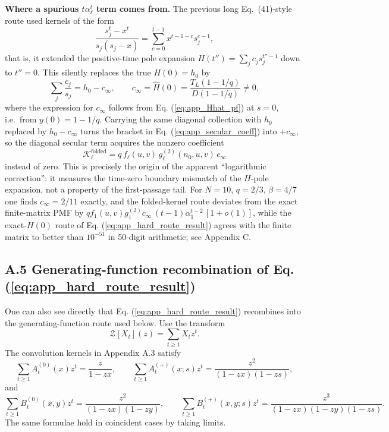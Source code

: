 \documentclass[superscriptaddress, amsmath, amssymb, aps, pre, floatfix]{revtex4-2}
\begin{document}
\medskip
\noindent\textbf{Where a spurious \(t\alpha_\ell^t\) term comes from.}
The previous long Eq.~(41)-style route used kernels of the form
\[
  \frac{s_j^{t}-x^{t}}{s_j(s_j-x)}=\sum_{c=0}^{t-1}x^{t-1-c}s_j^{c-1},
\]
that is, it extended the positive-time pole expansion \(H(t'')=\sum_j c_js_j^{t''-1}\) down to \(t''=0\).  This silently replaces the true \(H(0)=h_0\) by
\[
  \sum_j\frac{c_j}{s_j}=h_0-c_\infty,
  \qquad
  c_\infty=\widehat H(0)=\frac{T_L(1-1/q)}{D(1-1/q)}\neq0,
\]
where the expression for \(c_\infty\) follows from Eq. (\ref{eq:app_Hhat_pf}) at \(s=0\), i.e.\ from \(y(0)=1-1/q\).  Carrying the same diagonal collection with \(h_0\) replaced by \(h_0-c_\infty\) turns the bracket in Eq. (\ref{eq:app_secular_coeff}) into \(+c_\infty\), so the diagonal secular term acquires the nonzero coefficient
\[
  \mathcal K^{\mathrm{folded}}_\ell=q\,f_\ell(u,v)\,g^{(2)}_\ell(n_0,u,v)\,c_\infty
\]
instead of zero.  This is precisely the origin of the apparent ``logarithmic correction'': it measures the time-zero boundary mismatch of the \(H\)-pole expansion, not a property of the first-passage tail.  For \(N=10\), \(q=2/3\), \(\beta=4/7\) one finds \(c_\infty=2/11\) exactly, and the folded-kernel route deviates from the exact finite-matrix PMF by \(q f_1(u,v)g^{(2)}_1 c_\infty\,(t-1)\alpha_1^{t-2}\,[1+o(1)]\), while the exact-\(H(0)\) route of Eq. (\ref{eq:app_hard_route_result}) agrees with the finite matrix to better than \(10^{-51}\) in 50-digit arithmetic; see Appendix C.

\subsection*{\texorpdfstring{A.5 Generating-function recombination of Eq. (\ref{eq:app_hard_route_result})}{A.5 Generating-function recombination of the expanded route}}

One can also see directly that Eq. (\ref{eq:app_hard_route_result}) recombines into the generating-function route used below.  Use the transform
\[
  \mathcal Z[X_t](z)=\sum_{t\geq1}X_tz^t.
\]
The convolution kernels in Appendix A.3 satisfy
\[
  \sum_{t\geq1}A_t^{(0)}(x)z^t=\frac{z}{1-zx},
  \qquad
  \sum_{t\geq1}A_t^{(+)}(x;s)z^t
  =\frac{z^2}{(1-zx)(1-zs)},
\]
and
\[
  \sum_{t\geq1}B_t^{(0)}(x,y)z^t
  =\frac{z^2}{(1-zx)(1-zy)},
  \qquad
  \sum_{t\geq1}B_t^{(+)}(x,y;s)z^t
  =\frac{z^3}{(1-zx)(1-zy)(1-zs)}.
\]
The same formulae hold in coincident cases by taking limits.
\end{document}
